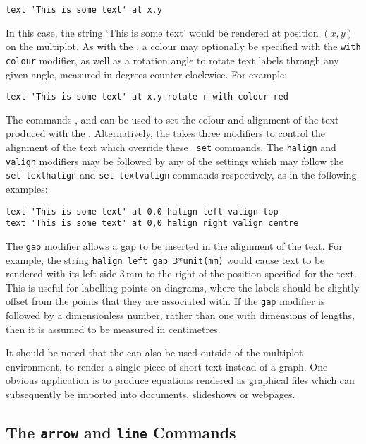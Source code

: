 \begin{verbatim}
text 'This is some text' at x,y
\end{verbatim}

In this case, the string `This is some text' would be rendered at position
$(x,y)$ on the multiplot. As with the , a colour may
optionally be specified with the {\tt with colour} modifier, as well as a
rotation angle to rotate text labels through any given angle, measured in
degrees counter-clockwise. For example:

\begin{verbatim}
text 'This is some text' at x,y rotate r with colour red
\end{verbatim}

The commands ,  and
 can be used to set the colour and alignment of the
text produced with the . Alternatively, the  takes
three modifiers to control the alignment of the text which override these {\tt
set} commands. The {\tt halign} and {\tt valign} modifiers may be followed by
any of the settings which may follow the {\tt set texthalign} and {\tt set
textvalign} commands respectively, as in the following examples:

\begin{verbatim}
text 'This is some text' at 0,0 halign left valign top
text 'This is some text' at 0,0 halign right valign centre
\end{verbatim}

\noindent The {\tt gap} modifier allows a gap to be inserted in the alignment
of the text. For example, the string {\tt halign left gap 3*unit(mm)} would
cause text to be rendered with its left side $3\,\mathrm{mm}$ to the right of
the position specified for the text. This is useful for labelling points on
diagrams, where the labels should be slightly offset from the points that they
are associated with. If the {\tt gap} modifier is followed by a dimensionless
number, rather than one with dimensions of lengths, then it is assumed to be
measured in centimetres.

It should be noted that the  can also be used outside of the
multiplot environment, to render a single piece of short text instead of a
graph. One obvious application is to produce equations rendered as graphical
files which can subsequently be imported into documents, slideshows or
webpages.

\subsection{The {\tt arrow} and {\tt line} Commands}

